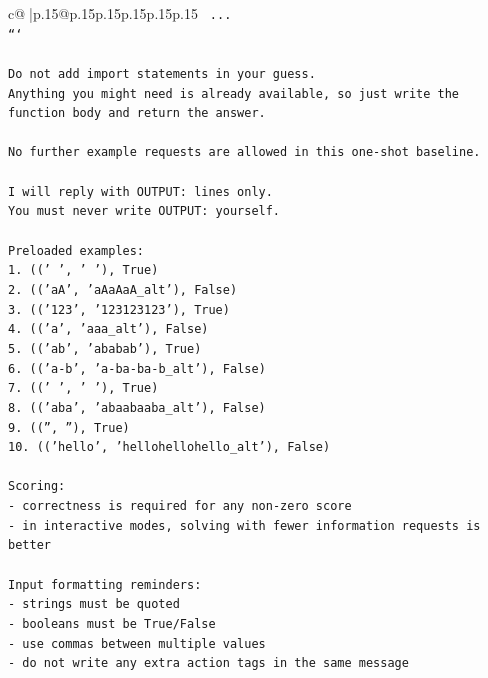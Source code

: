 \documentclass{article}
\begin{document}
{\begin{supertabular}{c@{$\;$}|p{.15\linewidth}@{}p{.15\linewidth}p{.15\linewidth}p{.15\linewidth}p{.15\linewidth}p{.15\linewidth}}
{{{\texttt{    ...} \\
\texttt{```} \\
\\ 
\texttt{Do not add import statements in your guess.} \\
\texttt{Anything you might need is already available, so just write the function body and return the answer.} \\
\\ 
\texttt{No further example requests are allowed in this one{-}shot baseline.} \\
\\ 
\texttt{I will reply with OUTPUT: lines only.} \\
\texttt{You must never write OUTPUT: yourself.} \\
\\ 
\texttt{Preloaded examples:} \\
\texttt{1. (('   ', '         '), True)} \\
\texttt{2. (('aA', 'aAaAaA\_alt'), False)} \\
\texttt{3. (('123', '123123123'), True)} \\
\texttt{4. (('a', 'aaa\_alt'), False)} \\
\texttt{5. (('ab', 'ababab'), True)} \\
\texttt{6. (('a{-}b', 'a{-}ba{-}ba{-}b\_alt'), False)} \\
\texttt{7. ((' ', '   '), True)} \\
\texttt{8. (('aba', 'abaabaaba\_alt'), False)} \\
\texttt{9. (('', ''), True)} \\
\texttt{10. (('hello', 'hellohellohello\_alt'), False)} \\
\\ 
\texttt{Scoring:} \\
\texttt{{-} correctness is required for any non{-}zero score} \\
\texttt{{-} in interactive modes, solving with fewer information requests is better} \\
\\ 
\texttt{Input formatting reminders:} \\
\texttt{{-} strings must be quoted} \\
\texttt{{-} booleans must be True/False} \\
\texttt{{-} use commas between multiple values} \\
\texttt{{-} do not write any extra action tags in the same message} \\
\\ 
}}}
\end{supertabular}}
\end{document}
